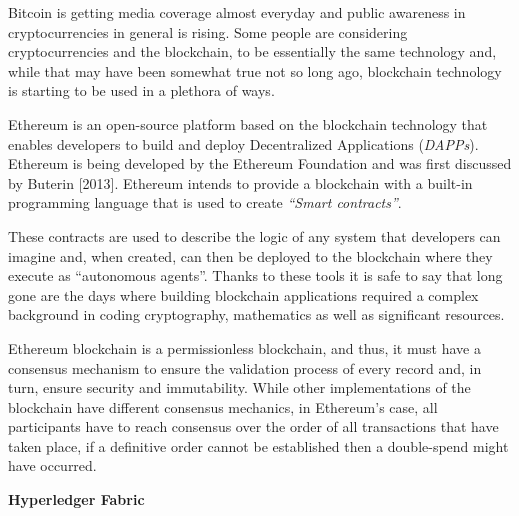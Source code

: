 \documentclass[notitlepage]{llncs}
\begin{document}
Bitcoin is getting media coverage almost everyday and public awareness in cryptocurrencies in general is rising. Some people are considering cryptocurrencies and the blockchain, to be essentially the same technology and, while that may have been somewhat true not so long ago, blockchain technology is starting to be used in a plethora of ways.
\par
Ethereum is an open-source platform based on the blockchain technology that enables developers to build and deploy Decentralized Applications (\textit{DAPPs}).
Ethereum is being developed by the Ethereum Foundation and was first discussed by Buterin [2013]. Ethereum intends to provide a blockchain with a built-in programming language that is used to create \textit{“Smart contracts”}.
\cite{Wood2017}
\par
These contracts are used to describe the logic of any system that developers can imagine and, when created, can then be deployed to the blockchain where they execute as “autonomous agents”. Thanks to these tools it is safe to say that long gone are the days where building blockchain applications required a complex background in coding cryptography, mathematics as well as significant resources.\cite{Wood2017,BlockGeeks2017}
\par
Ethereum blockchain is a permissionless blockchain, and thus, it must have a consensus mechanism to ensure the validation process of every record and, in turn, ensure security and immutability. While other implementations of the blockchain have different consensus mechanics, in Ethereum’s case, all participants have to reach consensus over the order of all transactions that have taken place, if a definitive order cannot be established then a double-spend might have occurred.
\par
\vspace{10pt}
\textbf{Hyperledger Fabric}
\vspace{6pt}
\end{document}
